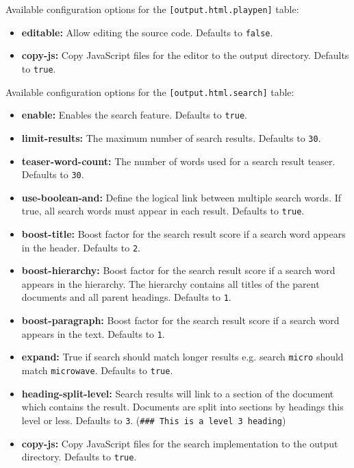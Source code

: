 \documentclass{article}
\begin{document}
Available configuration options for the \lstinline|[output.html.playpen]| table:\\
\begin{itemize}
\item \textbf{editable:} Allow editing the source code. Defaults to \lstinline|false|.
\item \textbf{copy-js:} Copy JavaScript files for the editor to the output directory.
Defaults to \lstinline|true|.
\end{itemize}

Available configuration options for the \lstinline|[output.html.search]| table:\\
\begin{itemize}
\item \textbf{enable:} Enables the search feature. Defaults to \lstinline|true|.
\item \textbf{limit-results:} The maximum number of search results. Defaults to \lstinline|30|.
\item \textbf{teaser-word-count:} The number of words used for a search result teaser.
Defaults to \lstinline|30|.
\item \textbf{use-boolean-and:} Define the logical link between multiple search words. If
true, all search words must appear in each result. Defaults to \lstinline|true|.
\item \textbf{boost-title:} Boost factor for the search result score if a search word
appears in the header. Defaults to \lstinline|2|.
\item \textbf{boost-hierarchy:} Boost factor for the search result score if a search word
appears in the hierarchy. The hierarchy contains all titles of the parent
documents and all parent headings. Defaults to \lstinline|1|.
\item \textbf{boost-paragraph:} Boost factor for the search result score if a search word
appears in the text. Defaults to \lstinline|1|.
\item \textbf{expand:} True if search should match longer results e.g. search \lstinline|micro|
should match \lstinline|microwave|. Defaults to \lstinline|true|.
\item \textbf{heading-split-level:} Search results will link to a section of the document
which contains the result. Documents are split into sections by headings this
level or less. Defaults to \lstinline|3|. (\lstinline|### This is a level 3 heading|)
\item \textbf{copy-js:} Copy JavaScript files for the search implementation to the output
directory. Defaults to \lstinline|true|.
\end{itemize}
\end{document}
